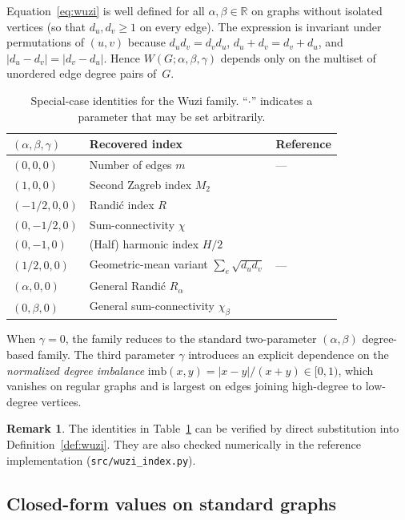 \documentclass[11pt,a4paper]{article}
\theoremstyle{definition}
\newtheorem{remark}[theorem]{Remark}
\newcommand{\Wuzi}{W(G;\alpha,\beta,\gamma)}
\begin{document}
Equation~\eqref{eq:wuzi} is well defined for all $\alpha,\beta\in\mathbb{R}$
on graphs without isolated vertices (so that $d_u,d_v\ge 1$ on every
edge). The expression is invariant under permutations of $(u,v)$
because $d_u d_v=d_v d_u$, $d_u+d_v=d_v+d_u$, and
$|d_u-d_v|=|d_v-d_u|$. Hence $\Wuzi$ depends only on the multiset of
unordered edge degree pairs of~$G$.

\begin{table}[h]
\centering
\caption{Special-case identities for the Wuzi family. ``$\cdot$'' indicates a parameter that may be set arbitrarily.}
\label{tab:specialcases}
\begin{tabular}{lll}
\toprule
$(\alpha,\beta,\gamma)$ & Recovered index & Reference\\
\midrule
$(0,0,0)$ & Number of edges $m$ & ---\\
$(1,0,0)$ & Second Zagreb index $M_2$ & \cite{Gutman1972}\\
$(-1/2,0,0)$ & Randi\'c index $R$ & \cite{Randic1975}\\
$(0,-1/2,0)$ & Sum-connectivity $\chi$ & \cite{ZhouTrinajstic2009sumconn}\\
$(0,-1,0)$ & (Half) harmonic index $H/2$ & \cite{Fajtlowicz1987Harmonic}\\
$(1/2,0,0)$ & Geometric-mean variant $\sum_e\sqrt{d_ud_v}$ & ---\\
$(\alpha,0,0)$ & General Randi\'c $R_\alpha$ & \cite{BollobasErdos1998}\\
$(0,\beta,0)$ & General sum-connectivity $\chi_\beta$ & \cite{ZhouTrinajstic2009sumconn}\\
\bottomrule
\end{tabular}
\end{table}

When $\gamma=0$, the family reduces to the standard two-parameter
$(\alpha,\beta)$ degree-based family. The third parameter
$\gamma$ introduces an explicit dependence on the
\emph{normalized degree imbalance}
\(\mathrm{imb}(x,y)=|x-y|/(x+y)\in[0,1)\),
which vanishes on regular graphs and is largest on edges joining
high-degree to low-degree vertices.

\begin{remark}\label{rem:identities}
The identities in Table~\ref{tab:specialcases} can be verified by
direct substitution into Definition~\ref{def:wuzi}. They are also
checked numerically in the reference implementation
(\texttt{src/wuzi\_index.py}).
\end{remark}

\subsection{Closed-form values on standard graphs}\label{sec:closedforms}
\end{document}
